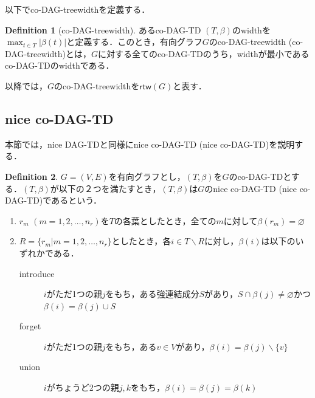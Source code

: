 \documentclass[master]{kuisthesis}		%
\theoremstyle{plain}
\theoremstyle{definition}
\newtheorem{definition*}{Definition}
\begin{document}
以下でco-DAG-treewidthを定義する．

\begin{definition*}[co-DAG-treewidth]
    あるco-DAG-TD $(T, \beta)$のwidthを$\max_{t \in T}|\beta(t)|$と定義する．このとき，有向グラフ$G$のco-DAG-treewidth (co-DAG-treewidth)とは，$G$に対する全てのco-DAG-TDのうち，widthが最小であるco-DAG-TDのwidthである．
\end{definition*}

以降では，$G$のco-DAG-treewidthを$\mathsf{rtw}(G)$と表す．


\subsection{nice co-DAG-TD}

本節では，nice DAG-TDと同様にnice co-DAG-TD (nice co-DAG-TD)を説明する．

\begin{definition*}
 $G=(V, E)$を有向グラフとし，$(T, \beta)$を$G$のco-DAG-TDとする．$(T, \beta)$が以下の２つを満たすとき，$(T, \beta)$は$G$のnice co-DAG-TD (nice co-DAG-TD)であるという．
 
\begin{enumerate}
    \item $r_m$ $(m = 1, 2, \dots, n_r)$を$T$の各葉としたとき，全ての$m$に対して$\beta(r_m) = \varnothing$ 
    \item $R = \{r_m | m = 1, 2, \dots, n_r\}$としたとき，各$i \in T \backslash R$に対し，$\beta(i)$は以下のいずれかである．
    \begin{description}
          \item[introduce] $i$がただ1つの親$j$をもち，ある強連結成分$S$があり，$S \cap \beta(j) \neq \varnothing$かつ$\beta(i) = \beta(j) \cup S$
          \item[forget] $i$がただ1つの親$j$をもち，ある$v \in V$があり，$\beta(i) = \beta(j) \backslash \{v\}$
          \item[union] $i$がちょうど2つの親$j, k$をもち，$\beta(i) = \beta(j) = \beta(k)$
    \end{description}
    \end{enumerate}
\end{definition*}
\end{document}
